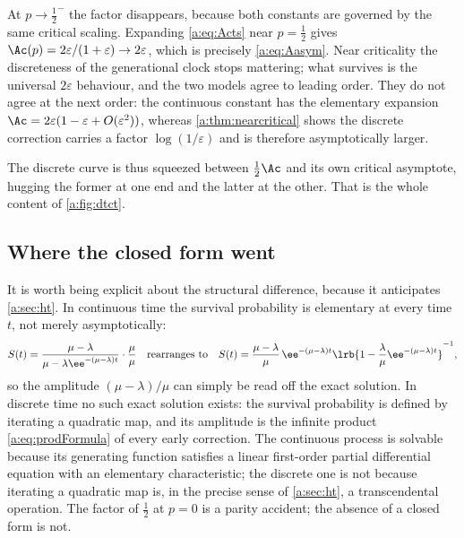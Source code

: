 At $p\to\tfrac12^-$ the factor disappears, because both constants are governed by
the same critical scaling. Expanding \cref{a:eq:Acts} near $p=\tfrac12$ gives
$\Ac(p) = 2\varepsilon/(1+\varepsilon)\to2\varepsilon$, which is precisely
\cref{a:eq:Aasym}. Near criticality the discreteness of the generational clock
stops mattering; what survives is the universal $2\varepsilon$ behaviour, and the
two models agree to leading order. They do not agree at the next order: the
continuous constant has the elementary expansion
$\Ac = 2\varepsilon(1-\varepsilon+O(\varepsilon^2))$, whereas
\cref{a:thm:nearcritical} shows the discrete correction carries a factor
$\log(1/\varepsilon)$ and is therefore asymptotically larger.

The discrete curve is thus squeezed between $\tfrac12\Ac$ and its own critical
asymptote, hugging the former at one end and the latter at the other. That is the
whole content of \cref{a:fig:dtct}.

\subsection*{Where the closed form went}

It is worth being explicit about the structural difference, because it anticipates
\cref{a:sec:ht}. In continuous time the survival probability is elementary at every
time $t$, not merely asymptotically:
\begin{equation}
\label{a:eq:ctsSagain}
S(t) = \frac{\mu-\lambda}{\mu-\lambda\ee^{-(\mu-\lambda)t}}\cdot\frac{\mu}{\mu}
\quad\text{rearranges to}\quad
S(t) = \frac{\mu-\lambda}{\mu}\,\ee^{-(\mu-\lambda)t}
\lrb{1-\frac{\lambda}{\mu}\ee^{-(\mu-\lambda)t}}^{-1},
\end{equation}
so the amplitude $(\mu-\lambda)/\mu$ can simply be read off the exact solution.
In discrete time no such exact solution exists: the survival probability is defined
by iterating a quadratic map, and its amplitude is the infinite product
\cref{a:eq:prodFormula} of every early correction. The continuous process is
solvable because its generating function satisfies a linear first-order partial
differential equation with an elementary characteristic; the discrete one is not
because iterating a quadratic map is, in the precise sense of \cref{a:sec:ht}, a
transcendental operation. The factor of $\tfrac12$ at $p=0$ is a parity accident;
the absence of a closed form is not.

